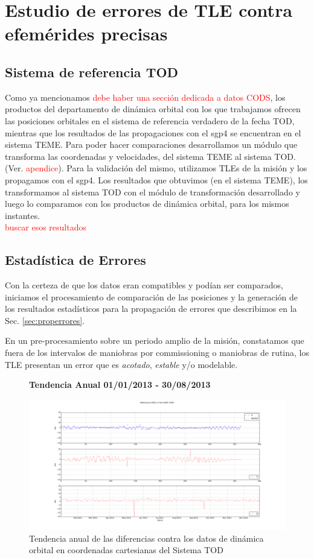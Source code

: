 \section{Estudio de errores de TLE contra efem\'erides precisas}
\subsection*{Sistema de referencia TOD}
Como ya mencionamos \textcolor{red}{debe haber una secci\'on dedicada a datos CODS}, los productos del departamento de din\'amica orbital con los que trabajamos ofrecen las posiciones orbitales en el sistema de referencia verdadero de la fecha \ac{TOD}, mientras que los resultados de las propagaciones con el sgp4 se encuentran en el sistema \ac{TEME}. Para poder hacer comparaciones desarrollamos un m\'odulo que transforma las coordenadas y velocidades, del sistema TEME al sistema TOD. (Ver. \textcolor{red}{apendice}).
Para la validaci\'on del mismo, utilizamos TLEs de la misi\'on y los propagamos con el sgp4. Los resultados que obtuvimos (en el sistema TEME), los transformamos al sistema TOD con el m\'odulo de transformaci\'on desarrollado y luego lo comparamos con los productos de din\'amica orbital, para los mismos instantes.\\

\textcolor{red}{buscar esos resultados}


\subsection*{Estad\'istica de Errores}
Con la certeza de que los datos eran compatibles y pod\'ian ser comparados, iniciamos el procesamiento de comparaci\'on de las posiciones y la generaci\'on de los resultados estad\'isticos para la propagaci\'on de errores que describimos en la Sec. \ref{sec:properrores}.

En un pre-procesamiento sobre un periodo amplio de la misi\'on, constatamos que fuera de los intervalos de maniobras por commissioning o maniobras de rutina, los TLE presentan un error que es {\it{acotado}}, {\it{estable}} y/o modelable.  

\begin{figure}[!h]
\centering
  \textbf{Tendencia Anual 01/01/2013 - 30/08/2013}\par\medskip
  \includegraphics[width=\textwidth]{imagenes/SACD2013todEjesajustados}
  \caption{Tendencia anual de las diferencias contra los datos de din\'amica orbital en coordenadas cartesianas del Sistema TOD}
\end{figure}


